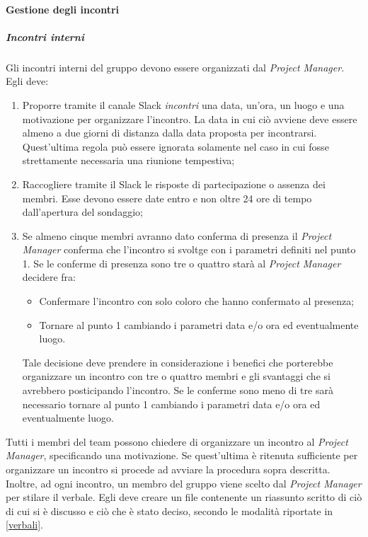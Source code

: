 \paragraph{Gestione degli incontri}
\subparagraph{Incontri interni} \Spazio
Gli incontri interni del gruppo devono essere organizzati dal \emph{Project Manager}. Egli deve:
\begin{enumerate}
	\item Proporre tramite il canale Slack \emph{incontri} una data, un'ora, un luogo e una motivazione per organizzare l'incontro. La data in cui ciò avviene deve essere almeno a due giorni di distanza dalla data proposta per incontrarsi. Quest'ultima regola può essere ignorata solamente nel caso in cui fosse strettamente necessaria una riunione tempestiva;

	\item Raccogliere tramite il  Slack  le risposte di partecipazione o assenza dei membri. Esse devono essere date entro e non oltre 24 ore di tempo dall'apertura del sondaggio;

	\item Se almeno cinque membri avranno dato conferma di presenza il \emph{Project Manager} conferma che l'incontro si svoltge con i parametri definiti nel punto 1.
	      Se le conferme di presenza sono tre o quattro starà al \emph{Project Manager} decidere fra:
	      \begin{itemize}
		      \item Confermare l'incontro con solo coloro che hanno confermato al presenza;
		      \item Tornare al punto 1 cambiando i parametri data e/o ora ed eventualmente luogo.
	      \end{itemize}
	      Tale decisione deve prendere in considerazione i benefici che porterebbe organizzare un incontro con tre o quattro membri e gli svantaggi che si avrebbero posticipando l'incontro.
	      Se le conferme sono meno di tre sarà necessario tornare al punto 1 cambiando i parametri data e/o ora ed eventualmente luogo.
\end{enumerate}
Tutti i membri del team possono chiedere di organizzare un incontro al \emph{Project Manager}, specificando una motivazione. Se quest'ultima è ritenuta sufficiente per organizzare un incontro si procede ad avviare la procedura sopra descritta.
\\Inoltre, ad ogni incontro, un membro del gruppo viene scelto dal \emph{Project Manager} per stilare il verbale. Egli deve creare un file contenente un riassunto scritto di ciò di cui si è discusso e ciò che è stato deciso, secondo le modalità riportate in \ref{verbali}.

